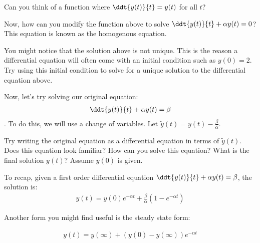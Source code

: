 
\begin{enumerate}

\qitem Can you think of a function where $\ddt{y(t)}{t} = y(t)$ for all $t$?

\sol{
}

\qitem Now, how can you modify the function above to solve $\ddt{y(t)}{t} + \alpha y(t) = 0$?
This equation is known as the homogenous equation.

\sol{
}

\qitem You might notice that the solution above is not unique.
This is the reason a differential equation will often come with an initial condition such as $y(0) = 2$.
Try using this initial condition to solve for a unique solution to the differential equation above.

\sol{
}

\qitem Now, let's try solving our original equation:
\begin{align}
    \ddt{y(t)}{t} + \alpha y(t) = \beta
\end{align}.
To do this, we will use a change of variables.
Let $\widetilde{y}(t) = y(t) - \frac{\beta}{\alpha}$.

\begin{enumerate}
\qitem Try writing the original equation as a differential equation in terms of $\widetilde{y}(t)$.
\qitem Does this equation look familiar? How can you solve this equation?
\qitem What is the final solution $y(t)$? Assume $y(0)$ is given.
\end{enumerate}

\sol{
}

To recap, given a first order differential equation $\ddt{y(t)}{t} + \alpha y(t) = \beta$, the solution is:
\begin{align}
    y(t) = y(0) e^{-\alpha t} + \frac{\beta}{\alpha} (1 - e^{-\alpha t})
\end{align}

Another form you might find useful is the steady state form:

\begin{align}
    y(t) = y(\infty) + (y(0) - y(\infty)) e^{-\alpha t}
\end{align}

\end{enumerate}
